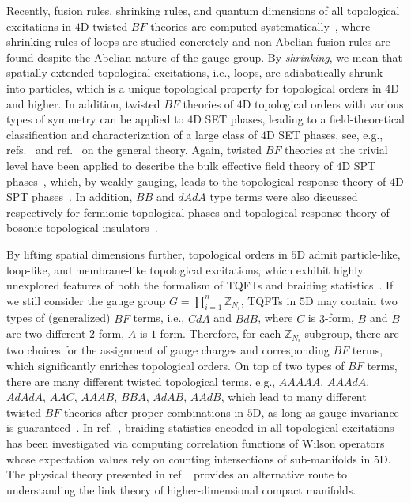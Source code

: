 \documentclass[11pt,nofootinbib,preprint]{revtex4-1}
\def\Z{\mathbb{Z}}
\begin{document}
   Recently, fusion rules, shrinking rules, and quantum dimensions of all topological excitations in $4$D  twisted $BF$ theories are computed systematically~\cite{PhysRevB.107.165117}, where shrinking rules of loops are studied concretely and  non-Abelian fusion rules are found despite the Abelian nature of the gauge group.   By \textit{shrinking}, we mean that spatially extended topological excitations, i.e., loops, are adiabatically shrunk into particles, which is a unique topological property for topological orders in $4$D and higher.  
   In addition, twisted $BF$ theories  of $4$D topological orders with various types of  symmetry can be applied to $4$D SET phases, leading to a field-theoretical classification and characterization of a large class of $4$D SET phases, see, e.g., refs.~\cite{ye16_set,2016arXiv161008645Y,Ye:2017aa,ye16a} and ref.~\cite{Ning2018prb} on the general theory. Again, twisted $BF$ theories at the trivial level have been applied to describe the bulk effective field theory of $4$D SPT phases~\cite{YeGu2015,bti2}, which, by weakly gauging, leads to the topological response theory of $4$D SPT phases~\cite{PhysRevLett.114.031601,PhysRevB.99.205120,bti6}. In addition, $BB$ and $dAdA$ type terms were also discussed respectively for fermionic topological phases and topological response theory of bosonic topological insulators~\cite{Kapustin:2014gua,PhysRevB.99.235137,ye2023unp,bti2,YW13a,lapa17}.
   
   
   By lifting spatial dimensions further, topological orders in $5$D admit particle-like, loop-like, and membrane-like topological excitations, which exhibit highly unexplored features of both the formalism of TQFTs and braiding statistics~\cite{Zhang:2021ycl}.   If we still consider the gauge group $G=\prod_{i=1}^n\Z_{N_i}$,  TQFTs in $5$D may contain two types of (generalized) $BF$ terms, i.e., $CdA$ and $\tilde{B}dB$, where $C$ is $3$-form, $B$ and $\tilde{B}$ are two different $2$-form, $A$ is $1$-form.  Therefore, for each $\Z_{N_i}$ subgroup, there are two choices for the assignment of gauge charges and corresponding $BF$ terms, which significantly enriches topological orders. On top of two types of $BF$ terms, there are many different twisted topological terms, e.g., $AAAAA$, $AAAdA$, $AdAdA$, $AAC$, $AAAB$, $BBA$, $AdAB$, $AAdB$, which lead to many different twisted $BF$ theories after proper combinations in $5$D,  as long as gauge invariance is guaranteed~\cite{zhang2021compatible}.  In ref.~\cite{Zhang:2021ycl}, braiding statistics encoded in all topological excitations has been investigated  via computing correlation functions of Wilson operators whose   expectation values  rely on  counting intersections of sub-manifolds in $5$D. The physical theory presented in ref.~\cite{Zhang:2021ycl}  provides an alternative route to understanding the link theory of higher-dimensional compact manifolds.  
\end{document}
